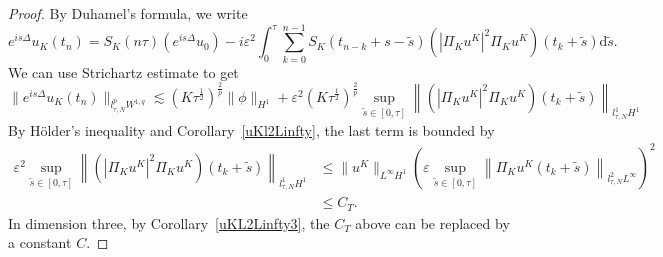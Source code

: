 \documentclass[10pt,a4paper]{article}
\begin{document}
  \begin{proof}
    By Duhamel's formula, we write
    \begin{equation}
      e^{is\Delta}u_K(t_n) = S_K(n\tau) (e^{is\Delta} u_0) 
      -i\varepsilon^2 \int_{0}^{\tau} \sum_{k=0}^{n-1} S_K(t_{n-k}+s-\tilde{s}) 
      \left(|\Pi_K u^K|^2 \Pi_K u^K\right)(t_k+\tilde{s}) \mathrm{d} \tilde{s}.
    \end{equation}
    We can use Strichartz estimate to get %
      \[ \|e^{is\Delta} u_K(t_n)\|_{l^p_{\tau,N}W^{1,q}} \lesssim
      (K\tau^\frac12)^\frac2p \|\phi\|_{H^1} 
      + \varepsilon^2
      (K\tau^\frac12)^\frac2p \sup_{\tilde{s}\in[0,\tau]}\left\| 
      \left(|\Pi_K u^K|^2 \Pi_K u^K\right)(t_k+\tilde{s}) \right\|_{l^1_{\tau,N}H^1} \]
    By H\"older's inequality and Corollary~\ref{uKl2Linfty}, the last term is
    bounded by
    \begin{equation*}
      \begin{aligned}
        \varepsilon^2 \sup_{\tilde{s}\in[0,\tau]}\left\| 
        \left(|\Pi_K u^K|^2 \Pi_K u^K\right)(t_k+\tilde{s}) \right\|_{l^1_{\tau,N}H^1} 
        &\leq \|u^K\|_{L^\infty H^1} \left( \varepsilon \sup_{\tilde{s} \in [0,\tau]} 
        \left\|\Pi_K u^K(t_k+\tilde{s})\right\|_{l_{\tau, N}^2
        L^{\infty}}\right)^2\\
        &\leq C_T.
      \end{aligned}
    \end{equation*}
    In dimension three, by Corollary~\ref{uKL2Linfty3}, the \(C_T\) above can be
    replaced by a constant \(C\).
  \end{proof}
\end{document}
